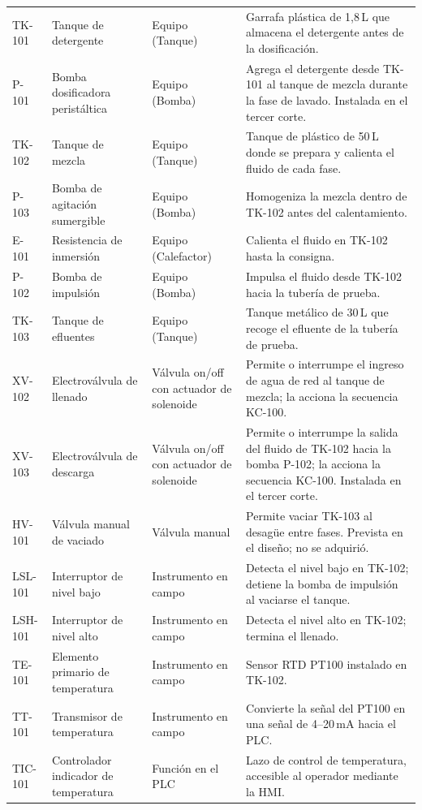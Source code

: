 \begin{scriptsize}
\begin{longtable}{L{2.5cm}L{3.5cm}L{3.0cm}L{\anchoflexpid}}
TK-101 & Tanque de detergente & Equipo (Tanque) & Garrafa plástica de 1,8\,L que almacena el detergente antes de la dosificación. \\
P-101 & Bomba dosificadora peristáltica & Equipo (Bomba) & Agrega el detergente desde TK-101 al tanque de mezcla durante la fase de lavado. Instalada en el tercer corte. \\
TK-102 & Tanque de mezcla & Equipo (Tanque) & Tanque de plástico de 50\,L donde se prepara y calienta el fluido de cada fase. \\
P-103 & Bomba de agitación sumergible & Equipo (Bomba) & Homogeniza la mezcla dentro de TK-102 antes del calentamiento. \\
E-101 & Resistencia de inmersión & Equipo (Calefactor) & Calienta el fluido en TK-102 hasta la consigna. \\
P-102 & Bomba de impulsión & Equipo (Bomba) & Impulsa el fluido desde TK-102 hacia la tubería de prueba. \\
TK-103 & Tanque de efluentes & Equipo (Tanque) & Tanque metálico de 30\,L que recoge el efluente de la tubería de prueba. \\
XV-102 & Electroválvula de llenado & Válvula on/off con actuador de solenoide & Permite o interrumpe el ingreso de agua de red al tanque de mezcla; la acciona la secuencia KC-100. \\
XV-103 & Electroválvula de descarga & Válvula on/off con actuador de solenoide & Permite o interrumpe la salida del fluido de TK-102 hacia la bomba P-102; la acciona la secuencia KC-100. Instalada en el tercer corte. \\
HV-101 & Válvula manual de vaciado & Válvula manual & Permite vaciar TK-103 al desagüe entre fases. Prevista en el diseño; no se adquirió. \\
LSL-101 & Interruptor de nivel bajo & Instrumento en campo & Detecta el nivel bajo en TK-102; detiene la bomba de impulsión al vaciarse el tanque. \\
LSH-101 & Interruptor de nivel alto & Instrumento en campo & Detecta el nivel alto en TK-102; termina el llenado. \\
TE-101 & Elemento primario de temperatura & Instrumento en campo & Sensor RTD PT100 instalado en TK-102. \\
TT-101 & Transmisor de temperatura & Instrumento en campo & Convierte la señal del PT100 en una señal de 4--20\,mA hacia el PLC. \\
TIC-101 & Controlador indicador de temperatura & Función en el PLC & Lazo de control de temperatura, accesible al operador mediante la HMI. \\

\end{longtable}
\end{scriptsize}
